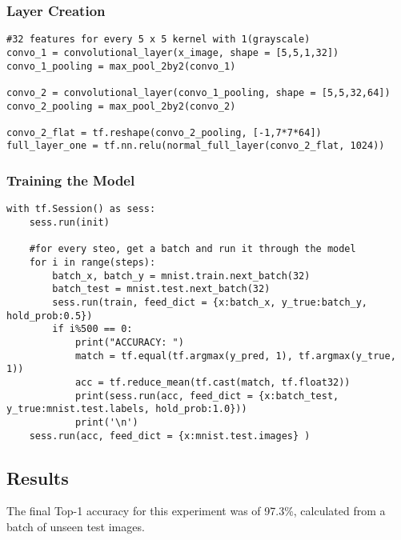 \tocless\subsubsection{Layer Creation}
\begin{lstlisting}[style=Python]
#32 features for every 5 x 5 kernel with 1(grayscale)
convo_1 = convolutional_layer(x_image, shape = [5,5,1,32])
convo_1_pooling = max_pool_2by2(convo_1)

convo_2 = convolutional_layer(convo_1_pooling, shape = [5,5,32,64])
convo_2_pooling = max_pool_2by2(convo_2)

convo_2_flat = tf.reshape(convo_2_pooling, [-1,7*7*64])
full_layer_one = tf.nn.relu(normal_full_layer(convo_2_flat, 1024))
\end{lstlisting}

\tocless\subsubsection{Training the Model}
\begin{lstlisting}[style=Python]
with tf.Session() as sess:
    sess.run(init)
    
    #for every steo, get a batch and run it through the model
    for i in range(steps):
        batch_x, batch_y = mnist.train.next_batch(32)
        batch_test = mnist.test.next_batch(32)
        sess.run(train, feed_dict = {x:batch_x, y_true:batch_y, hold_prob:0.5})
        if i%500 == 0:
            print("ACCURACY: ")
            match = tf.equal(tf.argmax(y_pred, 1), tf.argmax(y_true, 1))
            acc = tf.reduce_mean(tf.cast(match, tf.float32))
            print(sess.run(acc, feed_dict = {x:batch_test, y_true:mnist.test.labels, hold_prob:1.0}))
            print('\n')     
    sess.run(acc, feed_dict = {x:mnist.test.images} )
\end{lstlisting}

\tocless\subsection{Results}
The final Top-1 accuracy for this experiment was of 97.3\%, calculated from a batch of unseen test images.
